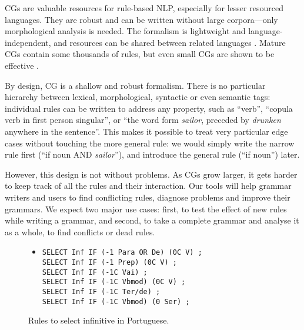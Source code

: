 CGs are valuable resources for rule-based NLP, especially for lesser
resourced languages. They are robust and can be written without large
corpora---only morphological analysis is needed. The formalism is
lightweight and language-independent, and resources can be shared
between related languages \cite{bick2006spanish,lene_trond_linda2010}.
Mature CGs contain some thousands of rules, but even small CGs are shown to be effective \cite{lene_trond2011}.


By design, CG is a shallow and robust formalism. 
There is no particular hierarchy between lexical, morphological,
syntactic or even semantic tags: individual rules can be written to address any
property, such as ``verb'', ``copula verb in first person singular'',
or ``the word form \emph{sailor}, preceded by \emph{drunken} anywhere in the
sentence''. This makes it possible to treat very particular edge
cases without touching the more general rule: we would simply write
the narrow rule first (``if noun AND \emph{sailor}''), and introduce
the general rule (``if noun'') later.


However, this design is not without problems. As CGs grow larger, it
gets harder to keep track of all the rules and their interaction.
Our tools will help grammar writers and users to find conflicting
rules, diagnose problems and improve their grammars. 
We expect two major use cases: 
first, to test the effect of new rules while writing a grammar, and
second, to take a complete grammar and analyse it as a whole, to find
conflicts or dead rules.



\begin{figure}[t]
\begin{center}

\begin{itemize}
\item[]
\begin{verbatim}SELECT Inf IF (-1 Para OR De) (0C V) ;
SELECT Inf IF (-1 Prep) (0C V) ;
SELECT Inf IF (-1C Vai) ;
SELECT Inf IF (-1C Vbmod) (0C V) ;
SELECT Inf IF (-1C Ter/de) ;
SELECT Inf IF (-1C Vbmod) (0 Ser) ;
\end{verbatim}
\end{itemize}

\caption{Rules to select infinitive in Portuguese.}
\end{center}

\label{infrules}
\end{figure}



